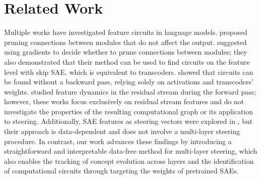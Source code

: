 \section{Related Work}
Multiple works have investigated feature circuits in language models. \citet{conmy2023automated} proposed pruning connections between modules that do not affect the output. \citet{ge2024automatically} suggested using gradients to decide whether to prune connections between modules; they also demonstrated that their method can be used to find circuits on the feature level with skip SAE, which is equivalent to transcoders. \citet{dunefsky2024transcoders} showed that circuits can be found without a backward pass, relying solely on activations and transcoders' weights. \citet{balagansky2024mechanistic_permutability, balcells2024evolutionsaefeatureslayers} studied feature dynamics in the residual stream during the forward pass; however, these works focus exclusively on residual stream features and do not investigate the properties of the resulting computational graph or its application to steering. Additionally, SAE features as steering vectors were explored in \citet{chalnev2024improvingsteeringvectorstargeting}, but their approach is data-dependent and does not involve a multi-layer steering procedure. In contrast, our work advances these findings by introducing a straightforward and interpretable data-free method for multi-layer steering, which also enables the tracking of concept evolution across layers and the identification of computational circuits through targeting the weights of pretrained SAEs.